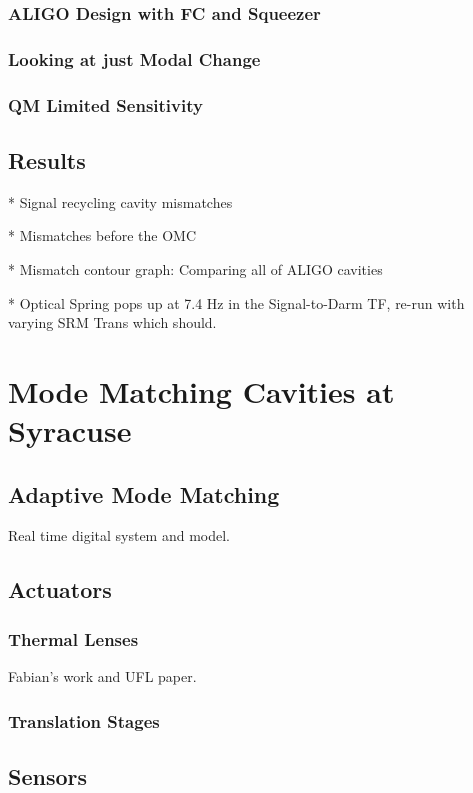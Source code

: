 \documentclass[10pt,a4paper]{book}
\begin{document}
\begin{linenumbers}
		\subsection{ALIGO Design with FC and Squeezer}
		\subsection{Looking at just Modal Change}
		\subsection{QM Limited Sensitivity}
			
	\section{Results}
		* Signal recycling cavity mismatches

		* Mismatches before the OMC
			
		* Mismatch contour graph: Comparing all of ALIGO cavities
			
		* Optical Spring pops up at 7.4 Hz in the Signal-to-Darm TF, re-run with varying SRM Trans which should.

\chapter{Mode Matching Cavities at Syracuse}

	\section{Adaptive Mode Matching}
	Real time digital system and model.
	
	\section{Actuators}
		\subsection{Thermal Lenses}
		Fabian's work and UFL paper.
		\subsection{Translation Stages}
		
	\section{Sensors}

\end{linenumbers}
\end{document}

